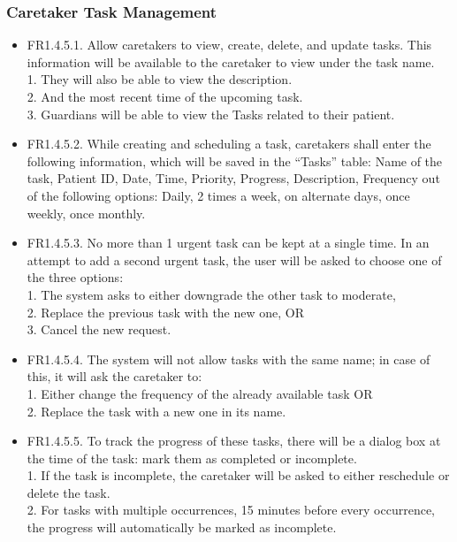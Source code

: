 \documentclass[12pt,a4paper]{article}
\begin{document}
\subsubsection{Caretaker Task Management}
\begin{itemize}
    \item FR1.4.5.1. Allow caretakers to view, create, delete, and update tasks. This information will be 
available to the caretaker to view under the task name.\\ 
1. They will also be able to view the description. \\
2.  And the most recent time of the upcoming task. \\
3. Guardians will be able to view the Tasks related to their patient.
    \item FR1.4.5.2. While creating and scheduling a task, caretakers shall enter the following information, 
which will be saved in the “Tasks” table: Name of the task, Patient ID, Date, Time, Priority, Progress, Description, Frequency out of the following options: Daily, 2 times a week, on alternate days, once weekly, once monthly.  
    \item FR1.4.5.3. No more than 1 urgent task can be kept at a single time. In an attempt to add a second 
urgent task, the user will be asked to choose one of the three options: \\
1. The system asks to either downgrade the other task to moderate, \\
2. Replace the previous task with the new one, OR \\
3. Cancel the new request. 
    \item FR1.4.5.4. The system will not allow tasks with the same name; in case of this, it will ask the 
caretaker to: \\
1. Either change the frequency of the already available task OR \\
2. Replace the task with a new one in its name. 
    \item FR1.4.5.5. To track the progress of these tasks, there will be a dialog box at the time of the task: 
mark them as completed or incomplete. \\
1. If the task is incomplete, the caretaker will be asked to either reschedule or delete 
the task. \\ 
2. For tasks with multiple occurrences, 15 minutes before every occurrence, the 
progress will automatically be marked as incomplete. 
\end{itemize}
\end{document}
